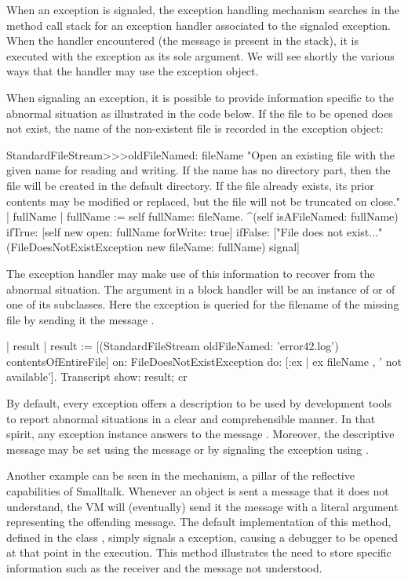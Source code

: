 \documentclass[a4paper,10pt,twoside]{book}
\begin{document}
When an exception is signaled, the exception handling mechanism searches in the method call stack for an exception handler associated to the signaled exception. When the handler encountered (\ie the message  is present in the stack), it is executed with the exception as its sole argument. We will see shortly the various ways that the handler may use the exception object.

When signaling an exception, it is possible to provide information specific to the abnormal situation as illustrated in the code below. If the file to be opened does not exist, the name of the non-existent file is recorded in the exception object:

\begin{code}{}
StandardFileStream>>>oldFileNamed: fileName
	"Open an existing file with the given name for reading and writing. If the name has no directory part, then the file will be created in the default directory. If the file already exists, its prior contents may be modified or replaced, but the file will not be truncated on close."
	| fullName |
	fullName := self fullName: fileName.
	^(self isAFileNamed: fullName)
		ifTrue: [self new open: fullName forWrite: true]
		ifFalse: ["File does not exist..."
			(FileDoesNotExistException new fileName: fullName) signal]
\end{code}

The exception handler may make use of this information to recover from the abnormal situation. The argument  in a block handler \ct{[:ex | ...]} will be an instance of  or of one of its subclasses. Here the exception is queried for the filename of the missing file by sending it the message .

\begin{code}{}
| result |
result := [(StandardFileStream oldFileNamed: 'error42.log') contentsOfEntireFile]
	on: FileDoesNotExistException
	do: [:ex | ex fileName , ' not available'].
Transcript show: result; cr
\end{code}

By default, every exception offers a description to be used by development tools to report abnormal situations in a clear and comprehensible manner. In that spirit, any exception instance answers to the message . Moreover, the descriptive message may be set  using the message  or by signaling the exception using .

Another example can be seen in the  mechanism, a pillar of the reflective capabilities of Smalltalk. Whenever an object is sent a message that it does not understand, the VM will (eventually) send it the message  with a literal argument representing the offending message. The default implementation of this method, defined in the class , simply signals a  exception, causing a debugger to be opened at that point in the execution.
This method illustrates the need to store specific information such as the receiver and the message not understood.
\end{document}
